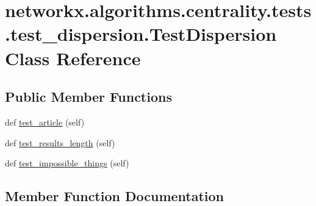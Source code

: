 \hypertarget{classnetworkx_1_1algorithms_1_1centrality_1_1tests_1_1test__dispersion_1_1TestDispersion}{}\section{networkx.\+algorithms.\+centrality.\+tests.\+test\+\_\+dispersion.\+Test\+Dispersion Class Reference}
\label{classnetworkx_1_1algorithms_1_1centrality_1_1tests_1_1test__dispersion_1_1TestDispersion}
\subsection*{Public Member Functions}
\begin{DoxyCompactItemize}
\item 
def \hyperlink{classnetworkx_1_1algorithms_1_1centrality_1_1tests_1_1test__dispersion_1_1TestDispersion_ae138f73cfaf6e5cccf1c936087fc2fa8}{test\+\_\+article} (self)
\item 
def \hyperlink{classnetworkx_1_1algorithms_1_1centrality_1_1tests_1_1test__dispersion_1_1TestDispersion_a0dc5caa6c340577d741cb997029f74e1}{test\+\_\+results\+\_\+length} (self)
\item 
def \hyperlink{classnetworkx_1_1algorithms_1_1centrality_1_1tests_1_1test__dispersion_1_1TestDispersion_a49f3313977ecbfc1c22343ca6e45dbde}{test\+\_\+impossible\+\_\+things} (self)
\end{DoxyCompactItemize}


\subsection{Member Function Documentation}
\mbox{\label{classnetworkx_1_1algorithms_1_1centrality_1_1tests_1_1test__dispersion_1_1TestDispersion_ae138f73cfaf6e5cccf1c936087fc2fa8}} 
